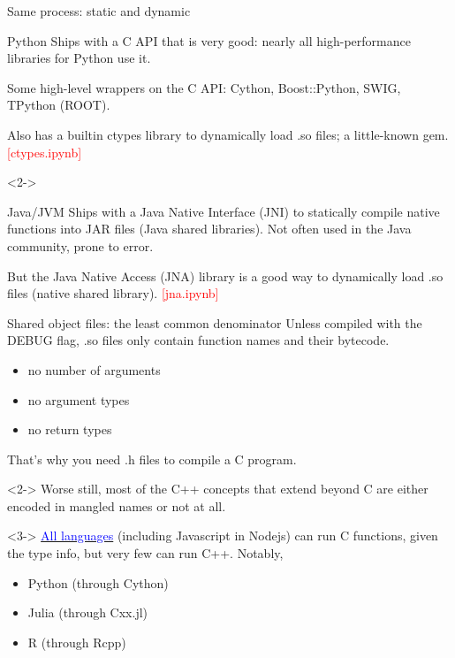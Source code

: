\documentclass{beamer}
\begin{document}
\begin{frame}{Same process: static and dynamic}
\vspace{0.25 cm}
\begin{block}{Python}
Ships with a C API that is very good: nearly all high-performance libraries for Python use it.

\vspace{0.25 cm}
Some high-level wrappers on the C API: Cython, Boost::Python, SWIG, TPython (ROOT).

\vspace{0.25 cm}
Also has a builtin ctypes library to dynamically load .so files; a little-known gem. \hfill \textcolor{red}{[ctypes.ipynb]}
\end{block}

\begin{uncoverenv}<2->
\begin{block}{Java/JVM}
Ships with a Java Native Interface (JNI) to statically compile native functions into JAR files (Java shared libraries). Not often used in the Java community, prone to error.

\vspace{0.25 cm}
But the Java Native Access (JNA) library is a good way to dynamically load .so files (native shared library). \hfill \textcolor{red}{[jna.ipynb]}
\end{block}
\end{uncoverenv}
\end{frame}

\begin{frame}{Shared object files: the least common denominator}
\vspace{0.5 cm}
Unless compiled with the DEBUG flag, .so files only contain function names and their bytecode.
\begin{itemize}
\item no number of arguments
\item no argument types
\item no return types
\end{itemize}
That's why you need .h files to compile a C program. \hspace{0.25 cm}{\tt :)}

\vspace{0.25 cm}
\begin{uncoverenv}<2->
Worse still, most of the C++ concepts that extend beyond C are either encoded in mangled names or not at all.
\end{uncoverenv}

\vspace{0.25 cm}
\begin{uncoverenv}<3->
\href{https://rosettacode.org/wiki/Call_a_foreign-language_function}{\textcolor{blue}{All languages}} (including Javascript in Nodejs) can run C functions, given the type info, but very few can run C++. Notably,
\begin{itemize}
\item Python (through Cython)
\item Julia (through Cxx.jl)
\item R (through Rcpp)
\end{itemize}
\end{uncoverenv}
\end{frame}
\end{document}
